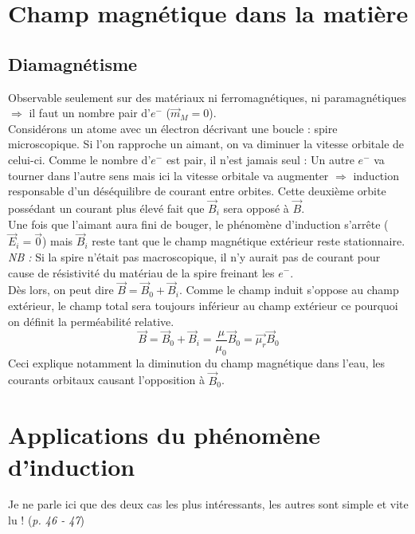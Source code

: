 \documentclass	[11pt, a4paper, openany]{book}
\begin{document}
\section{Champ magnétique dans la matière}
\subsection{Diamagnétisme}
Observable seulement sur des matériaux ni ferromagnétiques, ni paramagnétiques $\Rightarrow$ il faut un nombre pair d'$e^-$ ($\vec{m}_M = 0$).\\
Considérons un atome avec un électron décrivant une boucle : spire microscopique. Si l'on rapproche un aimant, on va diminuer la vitesse orbitale de celui-ci. Comme le nombre d'$e^-$ est pair, il n'est jamais seul : Un autre $e^-$ va tourner dans l'autre sens mais ici la vitesse orbitale va augmenter $\Rightarrow$ induction responsable d'un déséquilibre de courant entre orbites. Cette deuxième orbite possédant un courant plus élevé fait que $\vec{B}_i$ sera opposé à $\vec{B}$.\\

Une fois que l'aimant aura fini de bouger, le phénomène d'induction s'arrête ($\vec{E}_i = \vec{0}$) mais $\vec{B}_i$ reste tant que le champ magnétique extérieur reste stationnaire.\\

\textit{NB :} Si la spire n'était pas macroscopique, il  n'y aurait pas de courant pour cause de résistivité du matériau de la spire freinant les $e^-$.\\

Dès lors, on peut dire $\vec{B} = \vec{B}_0 + \vec{B}_i$. Comme le champ induit s'oppose au champ extérieur, le champ total sera toujours inférieur au champ extérieur ce pourquoi on définit la perméabilité relative.
\begin{equation}
	\vec{B} = \vec{B}_0 + \vec{B}_i = \frac{\mu}{\mu_0}\vec{B}_0 = \vec{\mu_r}\vec{B}_0
\end{equation}
Ceci explique notamment la diminution du champ magnétique dans l'eau, les courants orbitaux causant l'opposition à $\vec{B}_0$.

\section{Applications du phénomène d'induction}
Je ne parle ici que des deux cas les plus intéressants, les autres sont simple et vite lu ! (\textit{p. 46 - 47})
\end{document}
